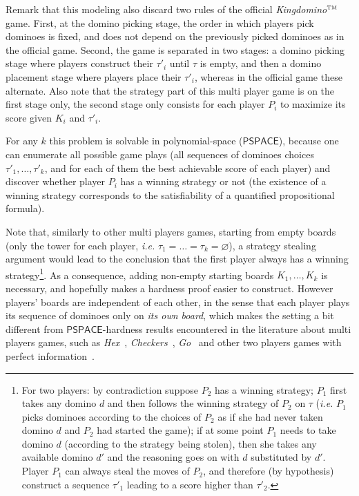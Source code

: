 \documentclass[11pt,a4paper]{article}
\newcommand{\1}{\mathbb{1}}
\newcommand{\0}{\mathbb{0}}
\newcommand{\PSPACE}{{\mathsf{PSPACE}}}
\let\emptyset\varnothing %
\newcommand{\tm}{$^\text{\tiny TM}$}
\begin{document}
Remark that this modeling also discard two rules of the official {\em
Kingdomino\tm} game. First, at the domino picking stage, the order in which
players pick dominoes is fixed, and does not depend on the previously picked
dominoes as in the official game. Second, the game is separated in two stages:
a domino picking stage where players construct their $\tau'_i$ until $\tau$ is
empty, and then a domino placement stage where players place their $\tau'_i$,
whereas in the official game these alternate. Also note that the strategy part
of this multi player game is on the first stage only, the second stage only
consists for each player $P_i$ to maximize its score given $K_i$ and $\tau'_i$.

For any $k$ this problem is solvable in polynomial-space ($\PSPACE$),
because one can enumerate all possible game plays (all sequences of dominoes
choices $\tau'_1,\dots,\tau'_k$, and for each of them the best achievable score
of each player) and discover whether player $P_i$
has a winning strategy or not (the existence of a winning strategy
corresponds to the satisfiability of a quantified propositional formula).

Note that, similarly to other multi players games, starting from
empty boards (only the tower for each player, {\em i.e.}
$\tau_1=\dots=\tau_k=\emptyset$), a strategy stealing argument would lead to
the conclusion that the first player always has a winning
strategy\footnote{For two players: by contradiction suppose $P_2$ has a winning
strategy; $P_1$ first takes any domino $d$ and then follows the winning
strategy of $P_2$ on $\tau$ ({\em i.e.} $P_1$ picks dominoes according to the
choices of $P_2$ as if she had never taken domino $d$ and $P_2$ had started the
game); if at some point $P_1$ needs to take domino $d$ (according to the
strategy being stolen), then she takes any available domino $d'$ and the
reasoning goes on with $d$ substituted by $d'$. Player $P_1$ can always steal the moves of $P_2$, and therefore (by hypothesis) construct a sequence $\tau'_1$ leading to a score higher than $\tau'_2$.}.
As a consequence, adding non-empty starting boards $K_1,\dots,K_k$ is necessary,
and hopefully makes a hardness proof easier to construct.
However players' boards are independent of each other,
in the sense that each player plays its sequence of dominoes only
on {\em its own board},
which makes the setting a bit different from $\PSPACE$-hardness results
encountered in the literature about multi players games, such as
{\em Hex}~\cite{hex1,hex2},
{\em Checkers}~\cite{checkers},
{\em Go}~\cite{go} %
and other two players games with perfect information~\cite{twoplayerperfectinfo}.
\end{document}
